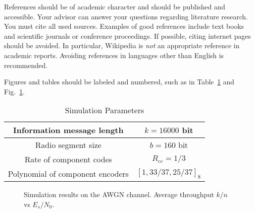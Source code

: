 \documentclass[journal, a4paper]{IEEEtran}
\begin{document}
References should be of academic character and should be published and accessible.
Your advisor can answer your questions regarding literature research.
You must cite all used sources.
Examples of good references include text books and scientific journals or conference proceedings.
If possible, citing internet pages should be avoided. In particular, Wikipedia is \emph{not} an appropriate reference in academic reports.
Avoiding references in languages other than English is recommended.

Figures and tables should be labeled and numbered, such as in Table~\ref{tab:simParameters} and Fig.~\ref{fig:tf_plot}.

\begin{table}[!hbt]
  \begin{center}
    \caption{Simulation Parameters}
    \label{tab:simParameters}
    \begin{tabular}{|c|c|}
      \hline
      Information message length       & $k=16000$ bit           \\
      \hline
      Radio segment size               & $b=160$ bit             \\
      \hline
      Rate of component codes          & $R_{cc}=1/3$            \\
      \hline
      Polynomial of component encoders & $[1 , 33/37 , 25/37]_8$ \\
      \hline
    \end{tabular}
  \end{center}
\end{table}


\begin{figure}[!hbt]
  \begin{center}
    \caption{Simulation results on the AWGN channel. Average throughput $k/n$ vs $E_s/N_0$.}
    \label{fig:tf_plot}
  \end{center}
\end{figure}
\end{document}
